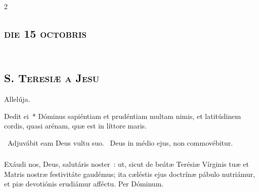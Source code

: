 \documentclass[9pt,twoside]{extarticle}
\begin{document}
\begin{multicols}{2}
%
\subsection*{\center \normalfont \textsc{die 15 octobris}}
\subsection*{\\ \textbf{\textsc{S. Teresiæ a Jesu}}}

\smallskip
\small {}

 Allelúja.

\normalsize
{} Dedit ei~* Dóminus sapiéntiam et prudéntiam multam nimis, et latitúdinem cordis, quasi arénam, quæ est in líttore maris.

~Adjuvábit eam Deus vultu suo. ~Deus in médio ejus, non commovébitur.

\subsubsection*{\center {}}
\lettrine{E}{x}áudi nos, Deus, salutáris noster~: ut, sicut de beátæ Terésiæ Vírginis tuæ et Matris nostræ festivitáte gaudémus; ita cæléstis ejus doctrínæ pábulo nutriámur, et piæ devotiónis erudiámur afféctu. Per Dóminum.


\end{multicols}
\end{document}
